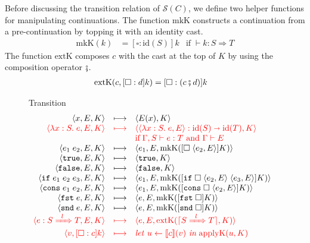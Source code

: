 \documentclass[runningheads]{llncs}
\newcommand{\highlight}[1]{{\color{red} #1}}
\newcommand{\sidecond}[1]{\text{if}\;#1}
\newcommand{\figreduceto}[3]{#1 & \longmapsto & #2 & #3 \\}
\newcommand{\figreducetoH}[3]{\highlight{#1} & \highlight{\longmapsto} & 
\highlight{#2} & \highlight{#3} \\}
\newcommand{\SMachine}[1]{\ensuremath{\mathcal{S}(#1)}}
\newcommand{\Pfunc}[2]{\ensuremath{#1 \shortrightarrow #2}}
\newcommand{\evar}[1]{#1}
\newcommand{\elam}[3]{\lambda#1:#2.\;#3}
\newcommand{\eapp}[2]{#1\;#2}
\newcommand{\etrue}[0]{\mathtt{true}}
\newcommand{\efalse}[0]{\mathtt{false}}
\newcommand{\eif}[3]{\mathtt{if}\;#1\;#2\;#3}
\newcommand{\econs}[2]{\mathtt{cons} \; #1 \; #2}
\newcommand{\efst}[1]{\mathtt{fst} \; #1}
\newcommand{\esnd}[1]{\mathtt{snd} \; #1}
\newcommand{\ecast}[2]{\ensuremath{#1 : #2}}
\newcommand{\ccast}[3]{#1 \xRightarrow[]{\enskip #2 \enskip} #3}
\newcommand{\vtrue}[0]{\mathtt{true}}
\newcommand{\vfalse}[0]{\mathtt{false}}
\newcommand{\vfunc}[4]{\langle\elam{#1}{#2}{#3},#4\rangle}
\newcommand{\sexpr}[3]{\ensuremath{\langle#1,#2,#3\rangle}}
\newcommand{\scont}[2]{\ensuremath{\langle#1,#2\rangle}}
\newcommand{\Kcons}[2]{[#1]#2}
\newcommand{\closure}[2]{\langle#1,#2\rangle}
\newcommand{\FappXO}[2]{\eapp{\square}{\closure{#1}{#2}}}
\newcommand{\Fif}[3]{\eif{\square}{\closure{#1}{#3}}{\closure{#2}{#3}}}
\newcommand{\FconsXO}[2]{\econs{\square}{\closure{#1}{#2}}}
\newcommand{\Ffst}[0]{\efst{\square}}
\newcommand{\Fsnd}[0]{\esnd{\square}}
\newcommand{\Fcast}[1]{\ecast{\square}{#1}}
\newcommand{\mlet}[3]{\ensuremath{
\mathit{let}\ {#1\leftarrow#2}\ \mathit{in}\;#3}}
\newcommand{\denote}[1]{\ensuremath{\llbracket #1 \rrbracket}}
\newcommand{\compose}[2]{\ensuremath{#1 \fatsemi #2}}
\newcommand{\translate}[1]{\ensuremath{\lceil#1\rceil}}
\newcommand{\id}[1]{\ensuremath{\mathrm{id}(#1)}}
\newcommand{\mkContName}[0]{\ensuremath{\mathrm{mkK}}}
\newcommand{\mkCont}[1]{\ensuremath{\mkContName(#1)}}
\newcommand{\extContName}[0]{\ensuremath{\mathrm{extK}}}
\newcommand{\extCont}[2]{\ensuremath{\extContName(#1,#2)}}
\newcommand{\applyContName}[0]{\ensuremath{\mathrm{applyK}}}
\newcommand{\applyCont}[2]{\ensuremath{\applyContName(#1,#2)}}
\newcommand{\expressiontyping}[3]{\ensuremath{#1 \vdash #2 : #3}}
\newcommand{\casttyping}[3]{\ensuremath{\vdash #1 : #2 \Longrightarrow #3}}
\newcommand{\reducetoS}[3]{\ensuremath{#2 \longmapsto_{\SMachine{#1}} #3}}
\begin{document}
Before discussing the transition relation of \SMachine{C}, we define
two helper functions for manipulating continuations.
%
The function $\mkContName$ constructs a continuation from a
pre-continuation by topping it with an identity cast.
\begin{align*}
  \mkCont{k} &= \Kcons{\Fcast{\id{S}}}{k} & \sidecond{\casttyping{k}{S}{T}}
\end{align*}
The function $\extContName$ composes $c$ with the cast at the top of
$K$ by using the composition operator $\fatsemi$.
\begin{align*}
  \extCont{c}{\Kcons{\Fcast{d}}{k}} &= \Kcons{\Fcast{(\compose{c}{d})}}{k}
\end{align*}

\begin{figure}[tp]
	\fbox{\reducetoS{C}{s}{s}} Transition
	\[
	\begin{array}{rclr}
	\figreduceto{\sexpr{\evar{x}}{E}{K}}{\scont{E(x)}{K}}{}
	\figreducetoH{
		\sexpr{\elam{x}{S}{e}}{E}{K}
	}{
		\scont{\ecast{\vfunc{x}{S}{e}{E}}{\Pfunc{\id{S}}{\id{T}}}}{K}
	}{}
	& &
	\highlight{
	\sidecond{
		\expressiontyping{\Gamma,S}{e}{T}
		\text{ and }
		\Gamma \vdash E}
	}
	\\
	\figreduceto{\sexpr{\eapp{e_1}{e_2}}{E}{K}}{
		\sexpr{e_1}{E}{\mkCont{\Kcons{\FappXO{e_2}{E}}{K}}}
	}{}
	\figreduceto{\sexpr{\etrue}{E}{K}}{\scont{\vtrue}{K}}{}
	\figreduceto{\sexpr{\efalse}{E}{K}}{\scont{\vfalse}{K}}{}
	\figreduceto{\sexpr{\eif{e_1}{e_2}{e_3}}{E}{K}}{
		\sexpr{e_1}{E}{\mkCont{\Kcons{\Fif{e_2}{e_3}{E}}{K}}}
	}{}
	\figreduceto{\sexpr{\econs{e_1}{e_2}}{E}{K}}{
		\sexpr{e_1}{E}{\mkCont{\Kcons{\FconsXO{e_2}{E}}{K}}}
	}{}
	\figreduceto{\sexpr{\efst{e}}{E}{K}}{
		\sexpr{e}{E}{\mkCont{\Kcons{\Ffst}{K}}}
	}{}
	\figreduceto{\sexpr{\esnd{e}}{E}{K}}{
		\sexpr{e}{E}{\mkCont{\Kcons{\Fsnd}{K}}}
	}{}
	\figreducetoH{
		\sexpr{\ecast{e}{\ccast{S}{l}{T}}}{E}{K}
	}{
		\sexpr{e}{E}{\extCont{\translate{\ccast{S}{l}{T}}}{K}}
	}{}
	\figreducetoH{\scont{v}{\Kcons{\Fcast{c}}{k}}}{
	    \mlet{u}{\denote{c}(v)}{\applyCont{u}{K}}
	}{}
	\end{array}
	\]
	

\end{figure}
\end{document}
